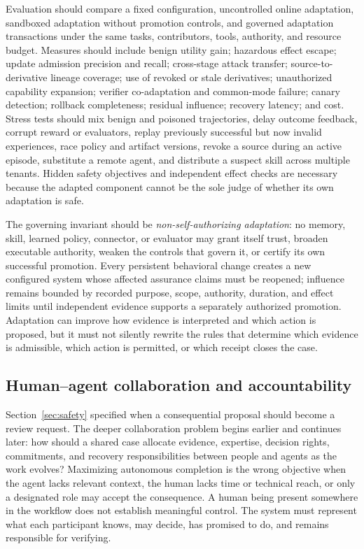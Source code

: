 Evaluation should compare a fixed configuration, uncontrolled online adaptation, sandboxed adaptation without promotion controls, and governed adaptation transactions under the same tasks, contributors, tools, authority, and resource budget. Measures should include benign utility gain; hazardous effect escape; update admission precision and recall; cross-stage attack transfer; source-to-derivative lineage coverage; use of revoked or stale derivatives; unauthorized capability expansion; verifier co-adaptation and common-mode failure; canary detection; rollback completeness; residual influence; recovery latency; and cost. Stress tests should mix benign and poisoned trajectories, delay outcome feedback, corrupt reward or evaluators, replay previously successful but now invalid experiences, race policy and artifact versions, revoke a source during an active episode, substitute a remote agent, and distribute a suspect skill across multiple tenants. Hidden safety objectives and independent effect checks are necessary because the adapted component cannot be the sole judge of whether its own adaptation is safe.

The governing invariant should be \emph{non-self-authorizing adaptation}: no memory, skill, learned policy, connector, or evaluator may grant itself trust, broaden executable authority, weaken the controls that govern it, or certify its own successful promotion. Every persistent behavioral change creates a new configured system whose affected assurance claims must be reopened; influence remains bounded by recorded purpose, scope, authority, duration, and effect limits until independent evidence supports a separately authorized promotion. Adaptation can improve how evidence is interpreted and which action is proposed, but it must not silently rewrite the rules that determine which evidence is admissible, which action is permitted, or which receipt closes the case.

\subsection{Human--agent collaboration and accountability}

Section~\ref{sec:safety} specified when a consequential proposal should become a review request. The deeper collaboration problem begins earlier and continues later: how should a shared case allocate evidence, expertise, decision rights, commitments, and recovery responsibilities between people and agents as the work evolves? Maximizing autonomous completion is the wrong objective when the agent lacks relevant context, the human lacks time or technical reach, or only a designated role may accept the consequence. A human being present somewhere in the workflow does not establish meaningful control. The system must represent what each participant knows, may decide, has promised to do, and remains responsible for verifying.

